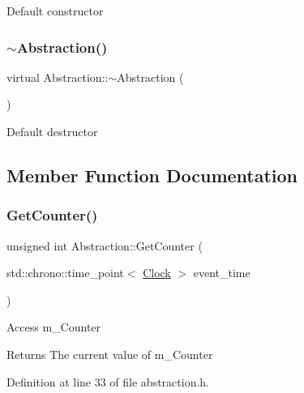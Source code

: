 Default constructor \mbox{\label{class_abstraction_aaf7d34417ea08792cc2b9449f9bfdc8e}} 
\subsubsection{\texorpdfstring{$\sim$\+Abstraction()}{~Abstraction()}}
{\footnotesize\ttfamily virtual Abstraction\+::$\sim$\+Abstraction (\begin{DoxyParamCaption}{ }\end{DoxyParamCaption})\hspace{0.3cm}{\ttfamily [virtual]}}

Default destructor 

\subsection{Member Function Documentation}
\mbox{\label{class_abstraction_a2b5e781d95a843a67db307b431f419a7}} 
\subsubsection{\texorpdfstring{Get\+Counter()}{GetCounter()}}
{\footnotesize\ttfamily unsigned int Abstraction\+::\+Get\+Counter (\begin{DoxyParamCaption}\item[{std\+::chrono\+::time\+\_\+point$<$ \hyperlink{universe_8h_a0ef8d951d1ca5ab3cfaf7ab4c7a6fd80}{Clock} $>$}]{event\+\_\+time }\end{DoxyParamCaption})\hspace{0.3cm}{\ttfamily [inline]}}

Access m\+\_\+\+Counter \begin{DoxyReturn}{Returns}
The current value of m\+\_\+\+Counter 
\end{DoxyReturn}


Definition at line 33 of file abstraction.\+h.

\mbox{\label{class_abstraction_a82cd32bf3de41f35ab76d80611fe6763}} 
